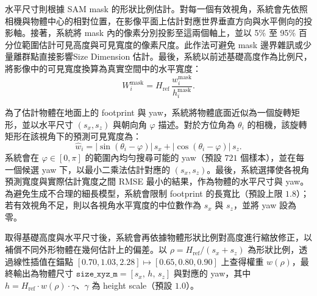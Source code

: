 \documentclass[12pt,a4paper]{article}
\begin{document}
水平尺寸則根據 SAM mask 的形狀比例估計。對每一個有效視角，系統會先依照相機與物體中心的相對位置，在影像平面上估計對應世界垂直方向與水平側向的投影軸。接著，系統將 mask 內的像素分別投影至這兩個軸上，並以 5\% 至 95\% 百分位範圍估計可見高度與可見寬度的像素尺度。此作法可避免 mask 邊界雜訊或少量離群點直接影響Size Dimension 估計。最後，系統以前述基礎高度作為比例尺，將影像中的可見寬度換算為真實空間中的水平寬度：
\begin{equation}
    W^{\mathrm{mask}}_i=H_{\mathrm{ref}}\,\frac{w^{\mathrm{mask}}_i}{h^{\mathrm{mask}}_i}.
\end{equation}

為了估計物體在地面上的 footprint 與 yaw，系統將物體底面近似為一個旋轉矩形，並以水平尺寸 $(s_x, s_z)$ 與朝向角 $\varphi$ 描述。對於方位角為 $\theta_i$ 的相機，該旋轉矩形在該視角下的預測可見寬度為：
\begin{equation}
    \hat{w}_i = \left|\sin(\theta_i - \varphi)\right|\,s_x + \left|\cos(\theta_i - \varphi)\right|\,s_z.
\end{equation}
系統會在 $\varphi \in [0, \pi]$ 的範圍內均勻搜尋可能的 yaw（預設 $721$ 個樣本），並在每一個候選 yaw 下，以最小二乘法估計對應的 $(s_x, s_z)$。最後，系統選擇使各視角預測寬度與實際估計寬度之間 RMSE 最小的結果，作為物體的水平尺寸與 yaw。為避免生成不合理的細長模型，系統會限制 footprint 的長寬比（預設上限 $1.8$）；若有效視角不足，則以各視角水平寬度的中位數作為 $s_x$ 與 $s_z$，並將 yaw 設為零。

取得基礎高度與水平尺寸後，系統會再依據物體形狀比例對高度進行縮放修正，以補償不同外形物體在幾何估計上的偏差。以 $\rho=H_{\mathrm{ref}}/(s_x+s_z)$ 為形狀比例，透過線性插值在錨點 $[0.70,1.03,2.28]\mapsto[0.65,0.80,0.90]$ 上查得權重 $w(\rho)$，最終輸出為物體尺寸 $\texttt{size\_xyz\_m} = [s_x,\, h,\, s_z]$ 與對應的 yaw，其中 $h=H_{\mathrm{ref}}\cdot w(\rho)\cdot\gamma$、$\gamma$ 為 height scale（預設 $1.0$）。
\end{document}
